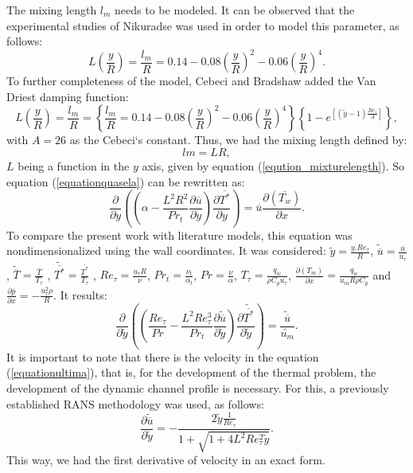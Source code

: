 \documentclass[10pt]{article} %
\begin{document}
The mixing length $ l_m $ needs to be modeled. It can be observed that the experimental studies of Nikuradse was used in order to model this parameter, as follows:
\begin{equation}
L\left(\frac{y}{R}\right) = \frac{l_m}{R} = 0.14 - 0.08 \left(\frac{y}{R}\right)^2 - 0.06\left(\frac{y}{R}\right)^4.
\end{equation}
To further completeness of the model, Cebeci and Bradshaw added the Van Driest damping function:
\begin{equation}\label{eqution_mixturelength}
L\left(\frac{y}{R}\right)  = \frac{l_m}{R} = \left\{\frac{l_m}{R} = 0.14 - 0.08 \left(\frac{y}{R}\right)^2 - 0.06\left(\frac{y}{R}\right)^4\right\}\left\{  1 - e^{[(\tilde{y} - 1) \frac{Re_\tau}{A}]}\right\},
\end{equation}
with $A = 26$ as the Cebeci`s constant. Thus, we had the mixing length defined by:
\begin{equation}
lm = L R,
\end{equation}
$ L $ being a function in the $ y $ axis, given by equation (\ref{eqution_mixturelength}). So equation (\ref{equationquasela}) can be rewritten as:
\begin{equation}\label{cebeciconstant}
{\frac{\partial{}}{\partial{y}}} \left( \left( \alpha   
- \frac{{L}^2 R ^2}{Pr_t}\frac{\partial \overline{u}}{\partial y} \right) \frac{\partial \overline{T^\ast}}{\partial y} \right)
= 
\overline{u}\frac{\partial{}\left(\overline{T_w}\right)  }{\partial{x}}.
\end{equation}
 To compare the present work with literature models, this equation was nondimensionalized using the wall coordinates. It was considered: $ \tilde{y} = \frac{y . Re_\tau}{R} $, $ \tilde{\overline{u}} = \frac{\overline{u}}{u_\tau} $ , $ \tilde{\overline{T}} = \frac{\overline{T}}{T_\tau} $ , $ \tilde{\overline{T^\ast}} = \frac{\overline{T^\ast}}{T_\tau} $ , $Re_\tau = \frac{u_\tau R}{\nu}$, $Pr_t = \frac{\nu_t}{\alpha_t}$, $Pr = \frac{\nu}{\alpha}$, $T_\tau = \frac{q_w}{\rho C_p u_\tau}$, $\frac{\partial{\left(T_m\right)}}{\partial{x}} = \frac{q_w}{u_m  R \rho  C_p } $ and $\frac{\partial \overline{p}}{\partial x} = - \frac{u_\tau^2 \rho}{R} $. It results:
\\
\begin{equation}\label{equationultima}
{\frac{\partial{}}{\partial{\tilde{y}}}} \left( \left( \frac{Re_\tau}{Pr}   
- \frac{{L}^2 Re_\tau ^3}{Pr_t}\frac{\partial \tilde{\overline{u}}}{\partial \tilde{y}} \right) \frac{\partial \tilde{\overline{T^\ast}}}{\partial \tilde{y}} \right)
= 
\frac{\tilde{\overline{u}}}{\tilde{u_m}}.
\end{equation}
It is important to note that there is the velocity in the equation (\ref{equationultima}), that is, for the development of the thermal problem, the development of the dynamic channel profile is necessary. For this, a previously established RANS methodology \cite{Luigi} was used, as follows:
\begin{equation}
\frac{\partial \tilde{\overline{u}}}{\partial \tilde{y}} = - \frac{2 \tilde{y} \frac{1}{Re_\tau} }{ 1 + \sqrt{ 1 + 4 L ^2 Re_\tau ^2 \tilde{y}}}.
\end{equation}		
This way, we had the first derivative of velocity in an exact form.
\end{document}
